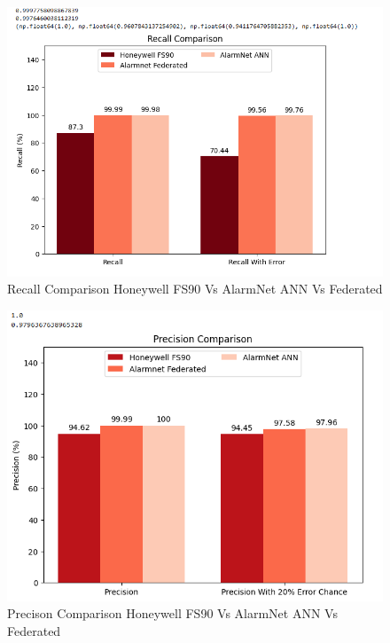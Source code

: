 \documentclass[conference]{IEEEtran}
\begin{document}
\begin{figure}
    \centering
    \includegraphics[width=0.75\linewidth]{images/Recall.png}
    \caption{Recall Comparison Honeywell FS90 Vs AlarmNet ANN Vs Federated}
    \label{fig:7.0}
\end{figure}

\begin{figure}
    \centering
    \includegraphics[width=0.75\linewidth]{images/PrecisionComparison.png}
    \caption{Precison Comparison Honeywell FS90 Vs AlarmNet ANN Vs Federated}
    \label{fig:7.1}
\end{figure}
\end{document}
